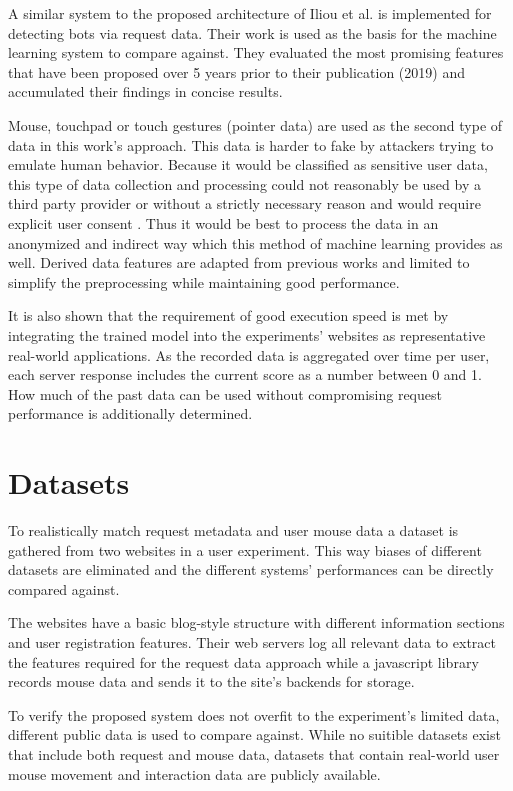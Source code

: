 \documentclass[
    fontsize=12pt,
    headings=small,
    parskip=half,           %
    bibliography=totoc,
    numbers=noenddot,       %
    open=any,               %
    final                   %
]{scrreprt}
\begin{document}
A similar system to the proposed architecture of Iliou et al. \cite{10.1145/3339252.3339267} is implemented for detecting bots via request data. Their work is used as the basis for the machine learning system to compare against. They evaluated the most promising features that have been proposed over 5 years prior to their publication (2019) and accumulated their findings in concise results.

Mouse, touchpad or touch gestures (pointer data) are used as the second type of data in this work's approach. This data is harder to fake by attackers trying to emulate human behavior. Because it would be classified as sensitive user data, this type of data collection and processing could not reasonably be used by a third party provider or without a strictly necessary reason and would require explicit user consent \cite{GDPR}. Thus it would be best to process the data in an anonymized and indirect way which this method of machine learning provides as well. Derived data features are adapted from previous works and limited to simplify the preprocessing while maintaining good performance.

It is also shown that the requirement of good execution speed is met by integrating the trained model into the experiments' websites as representative real-world applications. As the recorded data is aggregated over time per user, each server response includes the current score as a number between 0 and 1. How much of the past data can be used without compromising request performance is additionally determined.

\section{Datasets}

To realistically match request metadata and user mouse data a dataset is gathered from two websites in a user experiment. This way biases of different datasets are eliminated and the different systems' performances can be directly compared against.

The websites have a basic blog-style structure with different information sections and user registration features. Their web servers log all relevant data to extract the features required for the request data approach while a javascript library records mouse data and sends it to the site's backends for storage.

To verify the proposed system does not overfit to the experiment's limited data, different public data is used to compare against. While no suitible datasets exist that include both request and mouse data, datasets that contain real-world user mouse movement and interaction data are publicly available.
\end{document}
